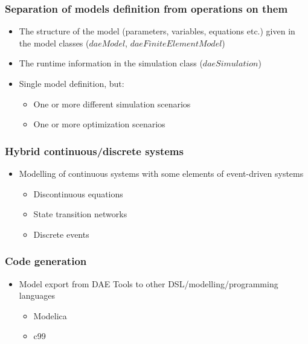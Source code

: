 \documentclass[compress,newPxFont,sthlmFooter]{beamer}
\begin{document}
\begin{frame}
\frametitle{Separation of models definition from operations on them}
\begin{block}{}
\begin{itemize}
  \item The structure of the model (parameters, variables, equations etc.) given in the model classes ($daeModel$, $daeFiniteElementModel$) 
  \item The runtime information in the simulation class ($daeSimulation$)
  \item Single model definition, but:
  \begin{itemize}
    \item One or more different simulation scenarios
    \item One or more optimization scenarios
  \end{itemize}
\end{itemize}
\end{block}
\end{frame}

\begin{frame}
\frametitle{Hybrid continuous/discrete systems}
\begin{block}{}
\begin{itemize}
  \item Modelling of continuous systems with some elements of event-driven systems 
  \begin{itemize}
    \item Discontinuous equations
    \item State transition networks
    \item Discrete events
  \end{itemize}
\end{itemize}
\end{block}
\end{frame}

\begin{frame}
\frametitle{Code generation}
\begin{block}{}
\begin{itemize}
  \item Model export from DAE Tools to other DSL/modelling/programming languages
  \begin{itemize}
    \item Modelica
    \item c99
  \end{itemize}
\end{itemize}
\end{block}
\end{frame}
\end{document}
